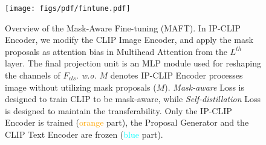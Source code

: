 \begin{figure}
\begin{center}
   \texttt{[image: figs/pdf/fintune.pdf]}
\end{center}
   \caption{
    Overview of the Mask-Aware Fine-tuning (MAFT). 
    In IP-CLIP Encoder, we modify the CLIP Image Encoder, and apply the mask proposals as attention bias in Multihead Attention from the $L^{th}$ layer. The final projection unit is an MLP module used for reshaping the channels of $F_{cls}$. \textit{w.o.} $M$ denotes IP-CLIP Encoder processes image without utilizing mask proposals ($M$). \textit{Mask-aware} Loss is designed to train CLIP to be mask-aware, while \textit{Self-distillation} Loss is designed to maintain the transferability. Only the IP-CLIP Encoder is trained (\textcolor{orange}{orange} part), the Proposal Generator and the CLIP Text Encoder are frozen (\textcolor{cyan}{blue} part).
   }
\label{fig:finetune}
\end{figure}
